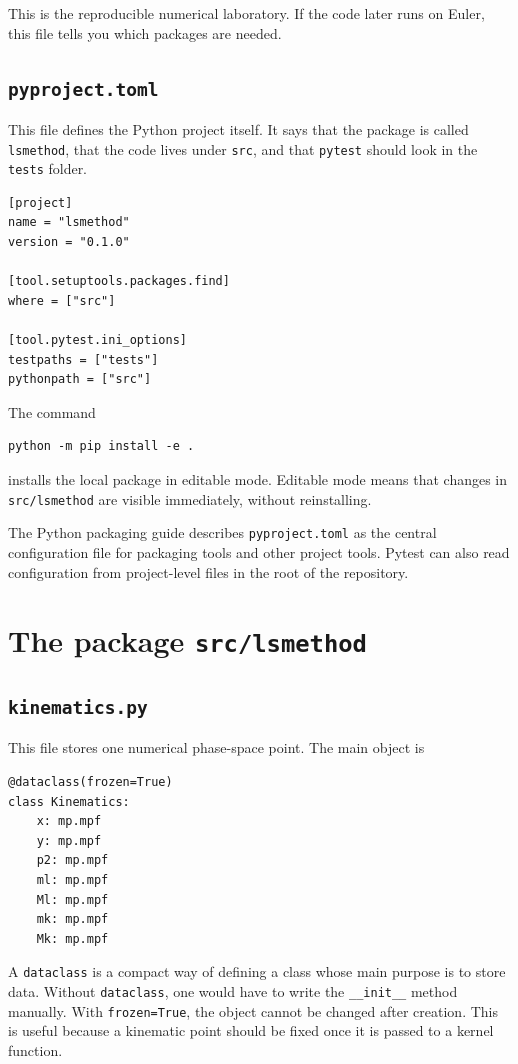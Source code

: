 \documentclass[11pt,a4paper]{article}
\begin{document}
This is the reproducible numerical laboratory. If the code later runs on Euler, this file tells you which packages are needed.

\subsection{\texttt{pyproject.toml}}

This file defines the Python project itself. It says that the package is called \texttt{lsmethod}, that the code lives under \texttt{src}, and that \texttt{pytest} should look in the \texttt{tests} folder.

\begin{lstlisting}
[project]
name = "lsmethod"
version = "0.1.0"

[tool.setuptools.packages.find]
where = ["src"]

[tool.pytest.ini_options]
testpaths = ["tests"]
pythonpath = ["src"]
\end{lstlisting}

The command
\begin{lstlisting}
python -m pip install -e .
\end{lstlisting}
installs the local package in editable mode. Editable mode means that changes in \texttt{src/lsmethod} are visible immediately, without reinstalling.

The Python packaging guide describes \texttt{pyproject.toml} as the central configuration file for packaging tools and other project tools. Pytest can also read configuration from project-level files in the root of the repository.

\section{The package \texttt{src/lsmethod}}

\subsection{\texttt{kinematics.py}}

This file stores one numerical phase-space point. The main object is
\begin{lstlisting}
@dataclass(frozen=True)
class Kinematics:
    x: mp.mpf
    y: mp.mpf
    p2: mp.mpf
    ml: mp.mpf
    Ml: mp.mpf
    mk: mp.mpf
    Mk: mp.mpf
\end{lstlisting}

A \texttt{dataclass} is a compact way of defining a class whose main purpose is to store data. Without \texttt{dataclass}, one would have to write the \texttt{\_\_init\_\_} method manually. With \texttt{frozen=True}, the object cannot be changed after creation. This is useful because a kinematic point should be fixed once it is passed to a kernel function.
\end{document}
